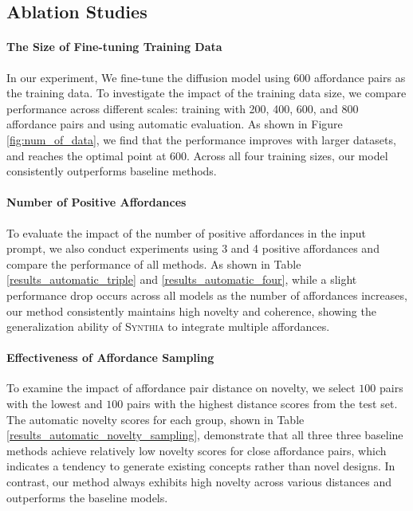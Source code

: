 \subsection{Ablation Studies}
\paragraph{The Size of Fine-tuning Training Data}
In our experiment, We fine-tune the diffusion model using 600 affordance pairs as the training data. To investigate the impact of the training data size, we compare performance across different scales: training with 200, 400, 600, and 800 affordance pairs and using automatic evaluation. As shown in Figure \ref{fig:num_of_data}, we find that the performance improves with larger datasets, and reaches the optimal point at 600. Across all four training sizes, our model consistently outperforms baseline methods.
\paragraph{Number of Positive Affordances}
To evaluate the impact of the number of positive affordances in the input prompt, we also conduct experiments using 3 and 4 positive affordances and compare the performance of all methods. As shown in Table \ref{results_automatic_triple} and \ref{results_automatic_four}, while a slight performance drop occurs across all models as the number of affordances increases, our method consistently maintains high novelty and coherence, showing the generalization ability of \textsc{Synthia} to integrate multiple affordances.
\paragraph{Effectiveness of Affordance Sampling}
To examine the impact of affordance pair distance on novelty, we select $100$ pairs with the lowest and $100$ pairs with the highest distance scores from the test set. The automatic novelty scores for each group, shown in Table \ref{results_automatic_novelty_sampling}, demonstrate that all three three baseline methods achieve relatively low novelty scores for close affordance pairs, which indicates a tendency to generate existing concepts rather than novel designs. In contrast, our method always exhibits high novelty across various distances and outperforms the baseline models.
